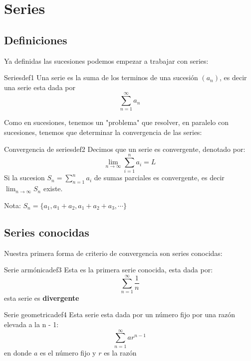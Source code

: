 \section{\Large Series}

\subsection{Definiciones}

Ya definidas las sucesiones podemos empezar a trabajar con series: 

\begin{definicion}{Series}{def1}
    Una serie es la suma de los terminos de una sucesión $(a_n)$, es decir una serie esta dada por 
    \[ 
        \sum_{n = 1}^{\infty} a_n
    \]
\end{definicion}

Como en sucesiones, tenemos un "problema" que resolver, en paralelo con sucesiones, tenemos que determinar la convergencia de las series:

\begin{definicion}{Convergencia de series}{def2}
    Decimos que un serie es convergente, denotado por:
    \[ 
        \lim_{n \to \infty} \sum_{i = 1}^{n} a_i = L
    \]
    Si la sucesion $S_n = \sum_{n = 1}^n a_i$ de sumas parciales es convergente, es decir $\lim_{n \to \infty} S_n$ existe. 
\end{definicion}

Nota: $S_n = \{a_1, a_1 + a_2, a_1 + a_2 + a_3, \cdots \}$

\subsection{Series conocidas}

Nuestra primera forma de criterio de convergencia son series conocidas:

\begin{definicion}{Serie armónica}{def3}
    Esta es la primera serie conocida, esta dada por:
    \[ 
        \sum_{n = 1}^{\infty} \frac{1}{n} 
    \]
    esta serie es \textbf{divergente}
\end{definicion}

\begin{definicion}{Serie geometrica}{def4}
    Esta serie esta dada por un número fijo por una razón elevada a la n - 1:
    \[ 
        \sum_{n = 1}^{\infty} ar^{n - 1} 
    \]
    en donde $a$ es el número fijo y $r$ es la razón
\end{definicion}

